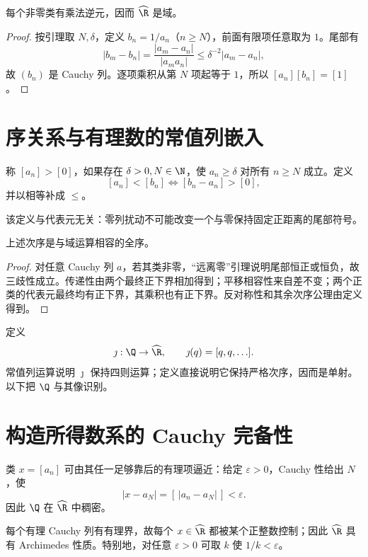 \begin{theorem}
每个非零类有乘法逆元，因而 \(\widehat{\R}\) 是域。
\end{theorem}

\begin{proof}
按引理取 \(N,\delta\)，定义 \(b_n=1/a_n\)（\(n\ge N\)），前面有限项任意取为 \(1\)。尾部有
\[
 |b_m-b_n|=\frac{|a_m-a_n|}{|a_ma_n|}
 \le\delta^{-2}|a_m-a_n|,
\]
故 \((b_n)\) 是 Cauchy 列。逐项乘积从第 \(N\) 项起等于 \(1\)，所以 \([a_n][b_n]=[1]\)。
\end{proof}

\section{序关系与有理数的常值列嵌入}

\begin{definition}
称 \([a_n]>[0]\)，如果存在 \(\delta>0,N\in\N\)，使 \(a_n\ge\delta\) 对所有 \(n\ge N\) 成立。定义
\[
 [a_n]<[b_n]\Longleftrightarrow[b_n-a_n]>[0],
\]
并以相等补成 \(\le\)。
\end{definition}

该定义与代表元无关：零列扰动不可能改变一个与零保持固定正距离的尾部符号。

\begin{theorem}
上述次序是与域运算相容的全序。
\end{theorem}

\begin{proof}
对任意 Cauchy 列 \(a\)，若其类非零，“远离零”引理说明尾部恒正或恒负，故三歧性成立。传递性由两个最终正下界相加得到；平移相容性来自差不变；两个正类的代表元最终均有正下界，其乘积也有正下界。反对称性和其余次序公理由定义得到。
\end{proof}

定义
\[
 \jmath:\Q\to\widehat{\R},\qquad
 \jmath(q)=[q,q,\ldots].
\]
常值列运算说明 \(\jmath\) 保持四则运算；定义直接说明它保持严格次序，因而是单射。以下把 \(\Q\) 与其像识别。

\section{构造所得数系的 Cauchy 完备性}

类 \(x=[a_n]\) 可由其任一足够靠后的有理项逼近：给定 \(\varepsilon>0\)，Cauchy 性给出 \(N\)，使
\[
 |x-a_N|=[\,|a_n-a_N|\,]<\varepsilon.
\]
因此 \(\Q\) 在 \(\widehat{\R}\) 中稠密。

每个有理 Cauchy 列有有理界，故每个 \(x\in\widehat{\R}\) 都被某个正整数控制；因此 \(\widehat{\R}\) 具有 Archimedes 性质。特别地，对任意 \(\varepsilon>0\) 可取 \(k\) 使 \(1/k<\varepsilon\)。


